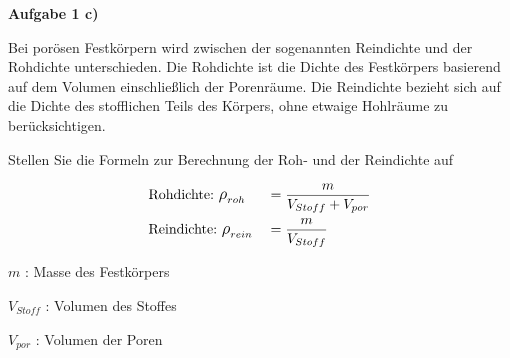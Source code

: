 \documentclass[aspectratio=169,9pt]{beamer}
\newcommand{\pp}{\par \vspace*{2mm}}
\newcommand{\antwort}[1]{
\begin{tcolorbox}[
	enhanced,
	colframe=unigrau!65,
	sharp corners,
	boxsep=1pt,
	colback=white,
	coltitle=black,
]
	#1
	\end{tcolorbox}
}
\begin{document}
\begin{frame}
\textbf{Aufgabe 1 c)}
\pp
\small
\begin{minipage}{.5\textwidth}
Bei porösen Festkörpern wird zwischen der sogenannten Reindichte
und der Rohdichte unterschieden. Die Rohdichte ist die Dichte des
Festkörpers basierend auf dem Volumen einschließlich der Porenräume.
Die Reindichte bezieht sich auf die Dichte des stofflichen Teils des
Körpers, ohne etwaige Hohlräume zu berücksichtigen.
\pp 
Stellen Sie die Formeln zur Berechnung der Roh- und der Reindichte
auf
\end{minipage}%
\hspace*{4mm}
\begin{minipage}{.5\textwidth}\pause

\antwort{
\begin{align*}
&\text{Rohdichte:}~{\mathlarger \rho}_{roh} &&= \frac{m}{V_{Stoff} + V_{por}} \\
&\text{Reindichte:}~{\mathlarger \rho}_{rein} &&= \frac{m}{V_{Stoff}}
\end{align*}
\pp
\footnotesize
$m$ : Masse des Festkörpers \par 
$V_{Stoff}$ : Volumen des Stoffes \par 
$ V_{por}$ : Volumen der Poren
}
\end{minipage}

\end{frame}



%
%
%
%
\end{document}
